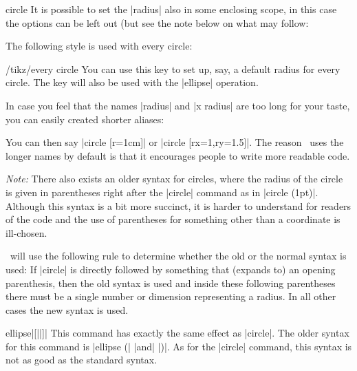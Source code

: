 \begin{pathoperation}{circle}{}
  It is possible to set the |radius| also in some enclosing scope, in
  this case the options can be left out (but see the note below on
  what may follow:
\begin{codeexample}[]
\end{codeexample}

  The following style is used with every circle:
  \begin{stylekey}{/tikz/every circle}
    You can use this key to set up, say, a default radius for every
    circle. The key will also be used with the |ellipse| operation.
  \end{stylekey}

  In case you feel that the names |radius| and |x radius| are too long
  for your taste, you can easily created shorter aliases:
\begin{codeexample}
\end{codeexample}
  You can then say |circle [r=1cm]| or |circle [rx=1,ry=1.5]|. The
  reason \tikzname\ uses the longer names by default is that it
  encourages people to write more readable code.

  \emph{Note:} There also exists an older syntax for circles, where
  the radius of the circle is given in parentheses right after the
  |circle| command as in |circle (1pt)|. Although this syntax is a bit
  more succinct, it is harder to understand for readers of the code
  and the use of parentheses for something other than a coordinate is
  ill-chosen.

  \tikzname\ will use the following rule to determine whether the old
  or the normal syntax is used: If |circle| is directly followed by
  something that (expands to) an opening parenthesis, then the old
  syntax is used and inside these following parentheses there must be
  a single number or dimension representing a radius. In all other
  cases the new syntax is used.
\end{pathoperation}

\begin{pathoperation}{ellipse}{|[||]|}
  This command has exactly the same effect as |circle|. The older
  syntax for this command is |ellipse (| |and| |)|. As for the |circle| command, this syntax is not as
  good as the standard syntax.
\begin{codeexample}[]
\end{codeexample}
\end{pathoperation}




